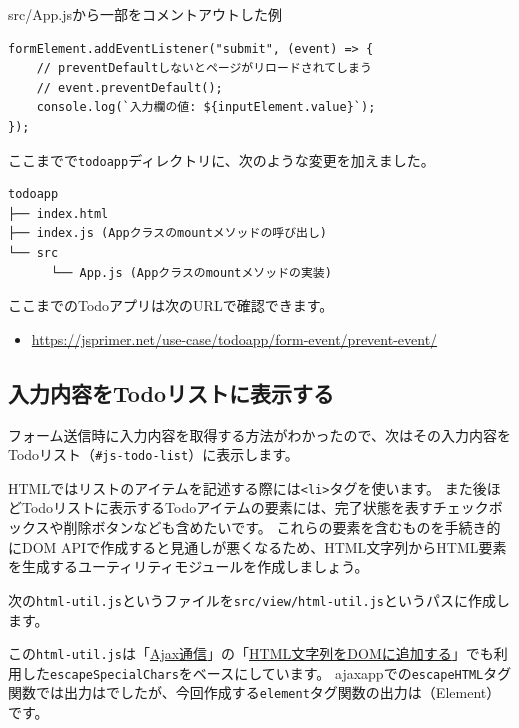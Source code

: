 \begin{listtitle}
src/App.jsから一部をコメントアウトした例
\end{listtitle}
\begin{lstlisting}
formElement.addEventListener("submit", (event) => {
    // preventDefaultしないとページがリロードされてしまう
    // event.preventDefault();
    console.log(`入力欄の値: ${inputElement.value}`);
});
\end{lstlisting}
\listend

ここまでで\texttt{todoapp}ディレクトリに、次のような変更を加えました。

\begin{lstlisting}
todoapp
├── index.html
├── index.js (Appクラスのmountメソッドの呼び出し)
└── src
      └── App.js (Appクラスのmountメソッドの実装)
\end{lstlisting}

ここまでのTodoアプリは次のURLで確認できます。

\begin{itemize}
\item
  \url{https://jsprimer.net/use-case/todoapp/form-event/prevent-event/}
\end{itemize}

\hypertarget{input-to-todolist}{%
\subsection{入力内容をTodoリストに表示する}\label{input-to-todolist}}

フォーム送信時に入力内容を取得する方法がわかったので、次はその入力内容をTodoリスト（\texttt{\#js-todo-list}）に表示します。

HTMLではリストのアイテムを記述する際には\texttt{<li>}タグを使います。
また後ほどTodoリストに表示するTodoアイテムの要素には、完了状態を表すチェックボックスや削除ボタンなども含めたいです。
これらの要素を含むものを手続き的にDOM
APIで作成すると見通しが悪くなるため、HTML文字列からHTML要素を生成するユーティリティモジュールを作成しましょう。

次の\texttt{html-util.js}というファイルを\texttt{src/view/html-util.js}というパスに作成します。

この\texttt{html-util.js}は「\hyperlink{usecase-ajax}{Ajax通信}」の「\hyperlink{html-to-dom}{HTML文字列をDOMに追加する}」でも利用した\texttt{escapeSpecialChars}をベースにしています。
ajaxappでの\texttt{escapeHTML}タグ関数では出力は\textbf{}でしたが、今回作成する\texttt{element}タグ関数の出力は\textbf{}（Element）です。

